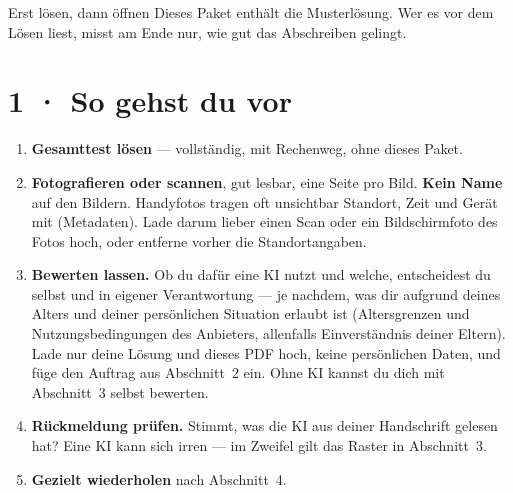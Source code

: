 \documentclass[11pt]{article}
\begin{document}

\begin{lpachtung}{Erst lösen, dann öffnen}
Dieses Paket enthält die Musterlösung. Wer es vor dem Lösen liest, misst am Ende nur, wie gut das Abschreiben gelingt.
\end{lpachtung}

\section*{1 · So gehst du vor}
\begin{enumerate}[leftmargin=*,itemsep=2pt]
\item \textbf{Gesamttest lösen} — vollständig, mit Rechenweg, ohne dieses Paket.
\item \textbf{Fotografieren oder scannen}, gut lesbar, eine Seite pro Bild. \textbf{Kein Name} auf den Bildern.
  Handyfotos tragen oft unsichtbar Standort, Zeit und Gerät mit (Metadaten). Lade darum lieber einen Scan oder ein
  Bildschirmfoto des Fotos hoch, oder entferne vorher die Standortangaben.
\item \textbf{Bewerten lassen.} Ob du dafür eine KI nutzt und welche, entscheidest du selbst und in eigener Verantwortung —
  je nachdem, was dir aufgrund deines Alters und deiner persönlichen Situation erlaubt ist (Altersgrenzen und
  Nutzungsbedingungen des Anbieters, allenfalls Einverständnis deiner Eltern). Lade nur deine Lösung und dieses PDF hoch,
  keine persönlichen Daten, und füge den Auftrag aus Abschnitt~2 ein. Ohne KI kannst du dich mit Abschnitt~3 selbst bewerten.
\item \textbf{Rückmeldung prüfen.} Stimmt, was die KI aus deiner Handschrift gelesen hat? Eine KI kann sich irren —
  im Zweifel gilt das Raster in Abschnitt~3.
\item \textbf{Gezielt wiederholen} nach Abschnitt~4.
\end{enumerate}
\end{document}
